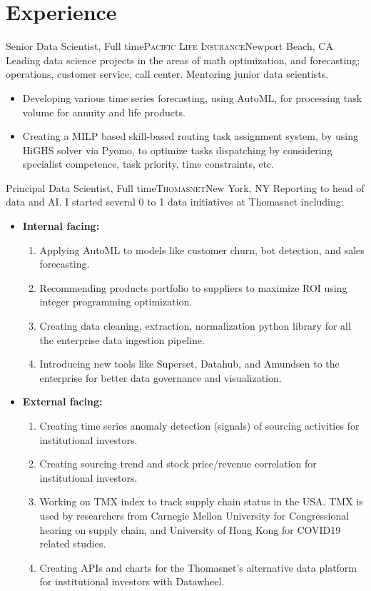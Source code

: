 \documentclass[12pt,a4paper,sans]{moderncv} %
\begin{document}
\section{Experience}
 {Senior Data Scientist, Full time}{\textsc{Pacific Life Insurance}}{Newport Beach, CA}{}{}
Leading data science projects in the areas of math optimization, and forecasting; operations, customer service, call center. Mentoring junior data scientists.
\begin{itemize}
\item Developing various time series forecasting, using AutoML, for processing task volume for annuity and life products.
\item Creating a MILP based skill-based routing task assignment system, by using HiGHS solver via Pyomo, to optimize tasks dispatching by considering specialist competence, task priority, time constraints, etc.


\end{itemize}


\bigskip
 
 {Principal Data Scientist, Full time}{\textsc{Thomasnet}}{New York, NY}{}{
Reporting to head of data and AI. I started several 0 to 1 data initiatives at Thomasnet including:}
\begin{itemize}
\item \textbf{Internal facing:}
    \begin{enumerate}
    \item Applying AutoML to models like customer churn, bot detection, and sales forecasting.
    \item Recommending products portfolio to suppliers to maximize ROI using integer programming optimization.
    \item  Creating data cleaning, extraction, normalization python library for all the enterprise data ingestion pipeline.
    \item Introducing new tools like Superset, Datahub, and Amundsen to the enterprise for better data governance and visualization.
    \end{enumerate}
\item \textbf{External facing:}
    \begin{enumerate}
    \item Creating time series anomaly detection (signals) of sourcing activities for institutional investors.
    \item Creating sourcing trend and stock price/revenue correlation for institutional investors.
    \item Working on TMX index to track supply chain status in the USA. TMX is used by researchers from Carnegie Mellon University for Congressional hearing on supply chain, and University of Hong Kong for COVID19 related studies.
    \item Creating APIs and charts for the Thomasnet's alternative data platform for institutional investors with Datawheel.
    \end{enumerate}
\end{itemize}
 \bigskip
\end{document}
